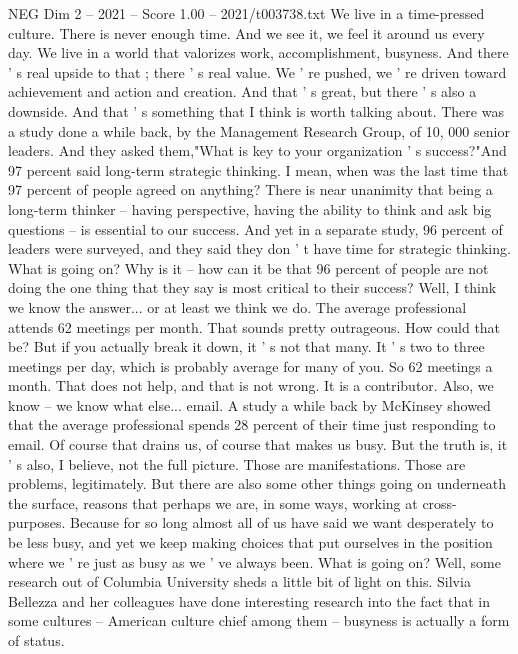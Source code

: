 \begin{textsample}{NEG Dim 2 – 2021 – Score 1.00 – 2021/t003738.txt}  \label{ex:f2_neg_068}
We live in a time-pressed culture.
There is never enough time.
And we see it, we feel it around us every day.
We live in a world that valorizes work, accomplishment, busyness.
And there ' s real upside to that ; there ' s real value.
We ' re pushed, we ' re driven toward achievement and action and creation.
And that ' s great, but there ' s also a downside.
And that ' s something that I think is worth talking about.
There was a study done a while back, by the Management Research Group, of 10, 000 senior leaders.
And they asked them,"What is key to your organization ' s success?"And 97 percent said long-term strategic thinking.
I mean, when was the last time that 97 percent of people agreed on anything?
There is near unanimity that being a long-term thinker -- having perspective, having the ability to think and ask big questions -- is essential to our success.
And yet in a separate study, 96 percent of leaders were surveyed, and they said they don ' t have time for strategic thinking.
What is going on?
Why is it -- how can it be that 96 percent of people are not doing the one thing that they say is most critical to their success?
Well, I think we know the answer... or at least we think we do.
The average professional attends 62 meetings per month.
That sounds pretty outrageous.
How could that be?
But if you actually break it down, it ' s not that many.
It ' s two to three meetings per day, which is probably average for many of you.
So 62 meetings a month.
That does not help, and that is not wrong.
It is a contributor.
Also, we know -- we know what else... email.
A study a while back by McKinsey showed that the average professional spends 28 percent of their time just responding to email.
Of course that drains us, of course that makes us busy.
But the truth is, it ' s also, I believe, not the full picture.
Those are manifestations.
Those are problems, legitimately.
But there are also some other things going on underneath the surface, reasons that perhaps we are, in some ways, working at cross-purposes.
Because for so long almost all of us have said we want desperately to be less busy, and yet we keep making choices that put ourselves in the position where we ' re just as busy as we ' ve always been.
What is going on?
Well, some research out of Columbia University sheds a little bit of light on this.
Silvia Bellezza and her colleagues have done interesting research into the fact that in some cultures -- American culture chief among them -- busyness is actually a form of status.

\end{textsample}
